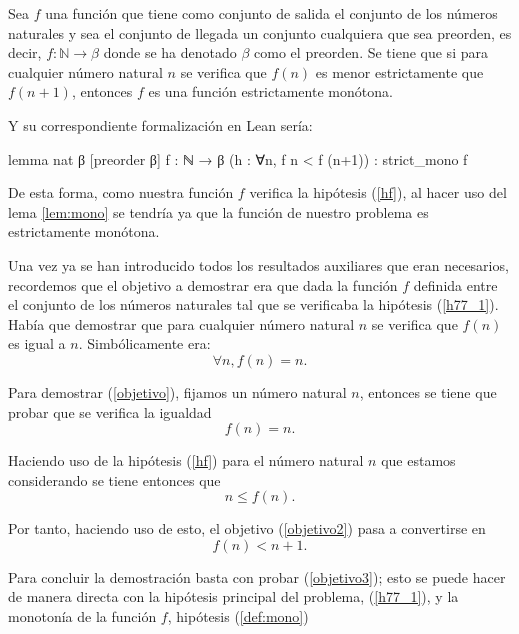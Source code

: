 \begin{demostracion}
  \begin{lema}\label{lem:mono}
    Sea \(f\) una función que tiene como conjunto de salida el conjunto
    de los números naturales y sea el conjunto de llegada un conjunto
    cualquiera que sea preorden, es decir, \(f:ℕ → β\) donde se ha
    denotado \(β\) como el preorden. Se tiene que si para cualquier
    número natural \(n\) se verifica que \(f(n)\) es menor estrictamente
    que \(f(n+1)\), entonces \(f\) es una función estrictamente
    monótona.
  \end{lema}

  Y su correspondiente formalización en Lean sería:
  \begin{leancode}
    lemma nat {β} [preorder β] {f : ℕ → β} (h : ∀n, f n < f (n+1)) :
    strict_mono f
  \end{leancode}

  De esta forma, como nuestra función \(f\) verifica la hipótesis
  (\ref{hf}), al hacer uso del lema \ref{lem:mono} se tendría ya que la
  función de nuestro problema es estrictamente monótona.

  Una vez ya se han introducido todos los resultados auxiliares que eran
  necesarios, recordemos que el objetivo a demostrar era que dada la
  función \(f\) definida entre el conjunto de los números naturales tal
  que se verificaba la hipótesis (\ref{h77_1}). Había que demostrar que
  para cualquier número natural \(n\) se verifica que \(f(n)\) es igual
  a \(n\). Simbólicamente era:
  \begin{equation}\label{objetivo}
    ∀n, f(n) = n.
  \end{equation}

  Para demostrar (\ref{objetivo}), fijamos un número natural \(n\),
  entonces se tiene que probar que se verifica la igualdad
  \begin{equation}\label{objetivo2}
    f(n) = n.
  \end{equation}

  Haciendo uso de la hipótesis (\ref{hf}) para el número natural \(n\) que
  estamos considerando se tiene entonces que
  \begin{equation}
    n ≤ f(n).
  \end{equation}

  Por tanto, haciendo uso de esto, el objetivo (\ref{objetivo2}) pasa a
  convertirse en
  \begin{equation}\label{objetivo3}
    f(n) < n+1.
  \end{equation}

  Para concluir la demostración basta con probar (\ref{objetivo3}); esto se
  puede hacer de manera directa con la hipótesis principal del problema,
  (\ref{h77_1}), y la monotonía de la función \(f\), hipótesis (\ref{def:mono})
\end{demostracion}

